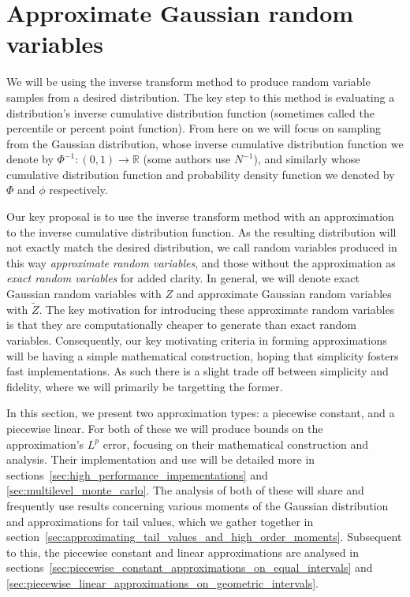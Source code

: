 \documentclass[manuscript,review]{acmart}
\begin{document}
\section{Approximate Gaussian random variables}
\label{sec:approximate_gaussian_random_variables}

We will be using the inverse transform method \citep[2.2.1]{glasserman2013monte} to produce random variable samples from a desired distribution. The key step to this method is evaluating a distribution's inverse cumulative distribution function (sometimes called the percentile or percent point function). From here on we will focus on sampling from the Gaussian distribution, whose inverse cumulative distribution function we denote by $ \Phi^{-1} \colon (0, 1) \to \mathbb{R} $ (some authors use $ N^{-1} $), and similarly whose cumulative distribution function and probability density function we denoted by $ \Phi $ and $ \phi $ respectively. 

Our key proposal is to use the inverse transform method with an approximation to the inverse cumulative distribution function. As the resulting distribution will not exactly match the desired distribution, we call random variables produced in this way \emph{approximate random variables}, and those without the approximation as \emph{exact random variables} for added clarity. In general, we will denote exact Gaussian random variables with $ Z $ and approximate Gaussian random variables with $ \tilde{Z} $. The key motivation for introducing these approximate random variables is that they are computationally cheaper to generate than exact random variables. Consequently, our key motivating criteria in forming approximations will be having a simple mathematical construction, hoping that simplicity fosters fast implementations. As such there is a slight trade off between simplicity and fidelity, where we will primarily be targetting the former. 

In this section, we present two approximation types: a piecewise constant, and a piecewise linear. For both of these we will produce bounds on the approximation's $ L^p $ error, focusing on their mathematical construction and analysis. Their implementation and use will be detailed more in sections~\ref{sec:high_performance_impementations} and \ref{sec:multilevel_monte_carlo}. The analysis of both of these will share and frequently use results concerning various moments of the Gaussian distribution and approximations for tail values, which we gather together in section~\ref{sec:approximating_tail_values_and_high_order_moments}. Subsequent to this, the piecewise constant and linear approximations are analysed in sections~\ref{sec:piecewise_constant_approximations_on_equal_intervals} and \ref{sec:piecewise_linear_approximations_on_geometric_intervals}.
\end{document}
